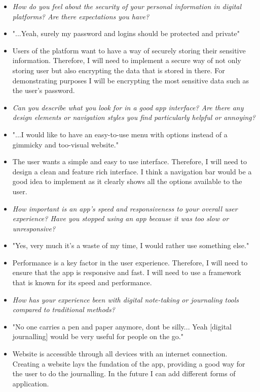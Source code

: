 \setcounter{question}{0}

\newcommand{\question}[1]{\item[Q\refstepcounter{question}\thequestion.] \textit{#1}}
\newcommand{\answer}[1]{\item[A\thequestion.] #1}


    \begin{itemize}
            \question{How do you feel about the security of your personal information in digital platforms? Are there expectations you have?}
            \answer{"...Yeah, surely my password and logins should be protected and private"}

            \item Users of the platform want to have a way of securely storing their sensitive information. Therefore, I will need to implement a secure way of not only storing user but also encrypting the data that is stored in there. For demonstrating purposes I will be encrypting the most sensitive data such as the user's password.
            

            \question{Can you describe what you look for in a good app interface? Are there any design elements or navigation styles you find particularly helpful or annoying?}
            \answer{"...I would like to have an easy-to-use menu with options instead of a gimmicky and too-visual website."}
            \item The user wants a simple and easy to use interface. Therefore, I will need to design a clean and feature rich interface. I think a navigation bar would be a good idea to implement as it clearly shows all the options available to the user.

            \question{How important is an app's speed and responsiveness to your overall user experience? Have you stopped using an app because it was too slow or unresponsive?}
            \answer{"Yes, very much it’s a waste of my time, I would rather use something else."}
            \item Performance is a key factor in the user experience. Therefore, I will need to ensure that the app is responsive and fast. I will need to use a framework that is known for its speed and performance.

            \question{How has your experience been with digital note-taking or journaling tools compared to traditional methods?}
            \answer{"No one carries a pen and paper anymore, dont be silly... Yeah [digital journalling] would be very useful for people on the go."}
            \item Website is accessible through all devices with an internet connection. Creating a website lays the fundation of the app, providing a good way for the user to do the journalling. In the future I can add different forms of application.


\end{itemize}
